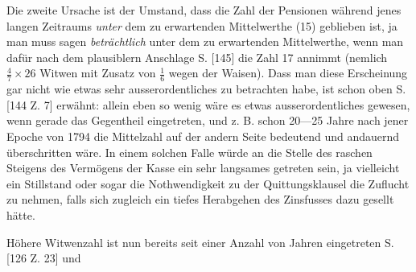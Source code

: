 Die zweite Ursache ist der Umstand, dass die Zahl der Pensionen während jenes langen Zeitraums \textit{unter} dem zu erwartenden Mittelwerthe (15) geblieben ist, ja man muss sagen \textit{beträchtlich} unter dem zu erwartenden Mittelwerthe, wenn man dafür nach dem plausiblern Anschlage S. [145] die Zahl 17 annimmt (nemlich \(\tfrac{4}{7}\times26\) Witwen mit Zusatz von \(\tfrac{1}{6}\) wegen der Waisen). Dass man diese Erscheinung gar nicht wie etwas sehr ausserordentliches zu betrachten habe, ist schon oben S. [144 Z. 7] erwähnt: allein eben so wenig wäre es etwas ausserordentliches gewesen, wenn gerade das Gegentheil eingetreten, und z. B. schon 20—25 Jahre nach jener Epoche von 1794 die Mittelzahl auf der andern Seite bedeutend und andauernd überschritten wäre. In einem solchen Falle würde an die Stelle des raschen Steigens des Vermögens der Kasse ein sehr langsames getreten sein, ja vielleicht ein Stillstand oder sogar die Nothwendigkeit zu der Quittungsklausel die Zuflucht zu nehmen, falls sich zugleich ein tiefes Herabgehen des Zinsfusses dazu gesellt hätte.

Höhere Witwenzahl ist nun bereits seit einer Anzahl von Jahren eingetreten S. [126 Z. 23] und
